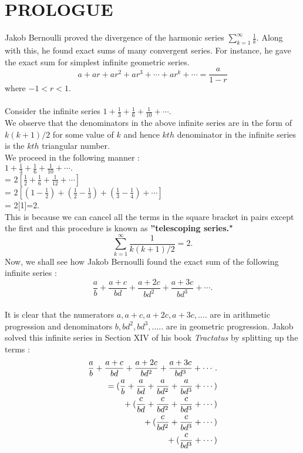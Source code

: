 \documentclass[a4paper,reqno,11pt]{book}
\theoremstyle{plain}%
\theoremstyle{definition}
\begin{document}
\section{PROLOGUE}
Jakob Bernoulli proved the divergence of 
the harmonic series $\sum_{k=1}^{\infty}\frac{1}{k}$. Along with this, he found exact sums of many convergent series. For instance, he gave the exact sum for simplest infinite geometric series.\\
$$a + ar + ar^2 + ar^3 + \cdots + ar^k + \cdots = \frac{a}{1-r}$$
where $-1 < r < 1.$\\
\\
Consider the infinite series $1 + \frac{1}{3} + \frac{1}{6} + \frac{1}{10} + \cdots.$\\
We observe that the denominators in the above infinite series are in the form of $k(k+1)/2$ for some value of $k$ and hence $kth$ denominator in the infinite series is the $kth$ triangular number.\\
We proceed in the following manner :\\
$1 + \frac{1}{3} + \frac{1}{6} + \frac{1}{10} + \cdots.$\\
= $2[\frac{1}{2} + \frac{1}{6} + \frac{1}{12} + \cdots ]$\\
= $2[(1-\frac{1}{2}) + (\frac{1}{2}-\frac{1}{3}) + (\frac{1}{3}-\frac{1}{4}) + \cdots]$\\
= 2[1]=2.\\
This is because we can cancel all the terms in the square bracket in pairs except the first and this procedure is known as \textbf{''telescoping series."}\\
$$\sum_{k=1}^{\infty} \frac{1}{k(k+1)/2} = 2.$$
\noindent Now, we shall see how Jakob Bernoulli found the exact sum of the following infinite series :\\
$$ \frac{a}{b} + \frac{a+c}{bd} + \frac{a+2c}{bd^2} + \frac{a+3c}{bd^3} + \cdots.$$
\\
It is clear that the numerators $a,a+c,a+2c,a+3c,.... $ are in arithmetic progression and denominators $b,bd^2,bd^3,.....$ are in geometric progression.
Jakob solved this infinite series in Section XIV of his book \textit{Tractatus} by splitting up the terms :\\
\begin{eqnarray*}
\frac{a}{b} + \frac{a+c}{bd} + \frac{a+2c}{bd^2} + \frac{a+3c}{bd^3} + \cdots.\\
= (\frac{a}{b} + \frac{a}{bd} + \frac{a}{bd^2} + \frac{a}{bd^3} + \cdots)\\
 \indent + (\frac{c}{bd} + \frac{c}{bd^2} + \frac{c}{bd^3} + \cdots)\\
\indent + (\frac{c}{bd^2} + \frac{c}{bd^3} + \cdots)\\
  \indent + (\frac{c}{bd^3} + \cdots)\\
  \end{eqnarray*}
\end{document}
